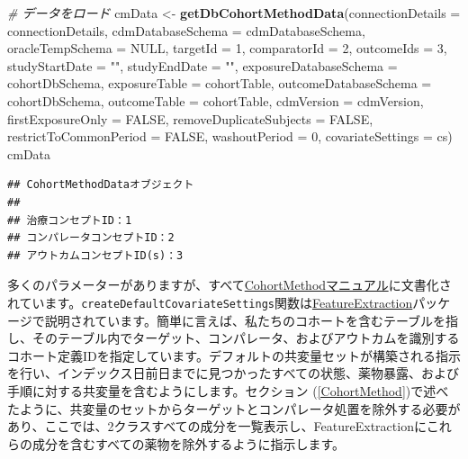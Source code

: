 \documentclass[
  11pt]{book}
\newenvironment{Shaded}{\begin{snugshade}}{\end{snugshade}}
\newcommand{\AttributeTok}[1]{\textcolor[rgb]{0.13,0.29,0.53}{#1}}
\newcommand{\CommentTok}[1]{\textcolor[rgb]{0.56,0.35,0.01}{\textit{#1}}}
\newcommand{\ConstantTok}[1]{\textcolor[rgb]{0.56,0.35,0.01}{#1}}
\newcommand{\DecValTok}[1]{\textcolor[rgb]{0.00,0.00,0.81}{#1}}
\newcommand{\FunctionTok}[1]{\textcolor[rgb]{0.13,0.29,0.53}{\textbf{#1}}}
\newcommand{\NormalTok}[1]{#1}
\newcommand{\OtherTok}[1]{\textcolor[rgb]{0.56,0.35,0.01}{#1}}
\newcommand{\StringTok}[1]{\textcolor[rgb]{0.31,0.60,0.02}{#1}}
\theoremstyle{definition}
\theoremstyle{definition}
\theoremstyle{definition}
\theoremstyle{definition}
\theoremstyle{remark}
\begin{document}
\begin{Shaded}
\begin{Highlighting}[]
\CommentTok{\# データをロード}
\NormalTok{cmData }\OtherTok{\textless{}{-}} \FunctionTok{getDbCohortMethodData}\NormalTok{(}\AttributeTok{connectionDetails =}\NormalTok{ connectionDetails,}
                                \AttributeTok{cdmDatabaseSchema =}\NormalTok{ cdmDatabaseSchema,}
                                \AttributeTok{oracleTempSchema =} \ConstantTok{NULL}\NormalTok{,}
                                \AttributeTok{targetId =} \DecValTok{1}\NormalTok{,}
                                \AttributeTok{comparatorId =} \DecValTok{2}\NormalTok{,}
                                \AttributeTok{outcomeIds =} \DecValTok{3}\NormalTok{,}
                                \AttributeTok{studyStartDate =} \StringTok{""}\NormalTok{,}
                                \AttributeTok{studyEndDate =} \StringTok{""}\NormalTok{,}
                                \AttributeTok{exposureDatabaseSchema =}\NormalTok{ cohortDbSchema,}
                                \AttributeTok{exposureTable =}\NormalTok{ cohortTable,}
                                \AttributeTok{outcomeDatabaseSchema =}\NormalTok{ cohortDbSchema,}
                                \AttributeTok{outcomeTable =}\NormalTok{ cohortTable,}
                                \AttributeTok{cdmVersion =}\NormalTok{ cdmVersion,}
                                \AttributeTok{firstExposureOnly =} \ConstantTok{FALSE}\NormalTok{,}
                                \AttributeTok{removeDuplicateSubjects =} \ConstantTok{FALSE}\NormalTok{,}
                                \AttributeTok{restrictToCommonPeriod =} \ConstantTok{FALSE}\NormalTok{,}
                                \AttributeTok{washoutPeriod =} \DecValTok{0}\NormalTok{,}
                                \AttributeTok{covariateSettings =}\NormalTok{ cs)}
\NormalTok{cmData}
\end{Highlighting}
\end{Shaded}

\begin{verbatim}
## CohortMethodDataオブジェクト
## 
## 治療コンセプトID：1
## コンパレータコンセプトID：2
## アウトカムコンセプトID(s)：3
\end{verbatim}

多くのパラメーターがありますが、すべて\href{https://ohdsi.github.io/CohortMethod/reference/}{CohortMethodマニュアル}に文書化されています。\texttt{createDefaultCovariateSettings}関数は\href{https://ohdsi.github.io/FeatureExtraction/}{FeatureExtraction}パッケージで説明されています。簡単に言えば、私たちのコホートを含むテーブルを指し、そのテーブル内でターゲット、コンパレータ、およびアウトカムを識別するコホート定義IDを指定しています。デフォルトの共変量セットが構築される指示を行い、インデックス日前日までに見つかったすべての状態、薬物暴露、および手順に対する共変量を含むようにします。セクション (\ref{CohortMethod})で述べたように、共変量のセットからターゲットとコンパレータ処置を除外する必要があり、ここでは、2クラスすべての成分を一覧表示し、FeatureExtractionにこれらの成分を含むすべての薬物を除外するように指示します。
\end{document}
